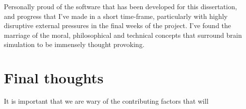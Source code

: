 Personally proud of the software that has been developed for this dissertation,
and progress that I've made in a short time-frame, particularly with highly
disruptive external pressures in the final weeks of the project. I've found the
marriage of the moral, philosophical and technical concepts that surround brain
simulation to be immensely thought provoking.

\section{Final thoughts}

It is important that we are wary of the contributing factors that will 


